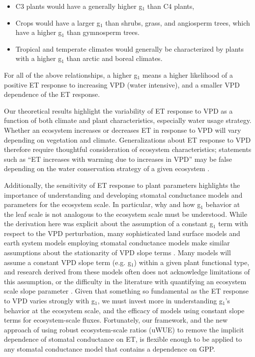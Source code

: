 \documentclass[12pt]{article}
\begin{document}
\begin{itemize}
  \item C3 plants would have a generally higher g$_1$ than C4 plants,
  \item Crops would have a larger g$_1$ than shrubs, grass, and
    angiosperm trees, which have a higher g$_1$ than gymnosperm
    trees.
  \item Tropical and temperate climates would generally be
    characterized by plants with a higher g$_1$ than arctic and boreal
    climates.
\end{itemize}
For all of the above relationships, a higher g$_1$ means a higher
likelihood of a positive ET response to increasing VPD (water
intensive), and a smaller VPD dependence of the ET response.

Our theoretical results highlight the variability of ET
response to VPD as a function of both climate  and plant
characteristics, especially water usage strategy. Whether an
ecosystem increases or decreases ET in response to VPD will vary
depending on vegetation and climate. Generalizations about ET response
to VPD therefore require thoughtful consideration of ecosystem
characteristics; statements such as ``ET increases with warming due to
increases in VPD'' may be false depending on the water conservation
strategy of a given ecosystem \cite{Lemordant_2018}.

Additionally, the sensitivity of ET response to plant parameters
highlights the importance of understanding and developing stomatal
conductance models and parameters for the ecosystem scale. In
particular, why and how g$_1$ behavior at the leaf scale is not
analogous to the ecosystem scale must be understood. While the
derivation here was explicit about the assumption of a constant g$_1$
term with respect to the VPD perturbation, many sophisticated land
surface models and earth system models employing stomatal conductance
models make similar assumptions about the stationarity of VPD slope
terms \cite{Niu_2011, Franks_2017, Rogers_2017, Lawrence_2019}. Many
models will assume a constant VPD slope term (e.g. g$_1$) within
a given plant functional type, and research derived from these models
often does not acknowledge limitations of this assumption, or the
difficulty in the literature with quantifying an ecosystem scale slope
parameter \cite{Medlyn_2017}. Given that something so fundamental as
the ET response to VPD varies strongly with g$_1$, we must invest more
in understanding g$_1$'s behavior at the ecosystem scale, and the
efficacy of models using constant slope terms for ecosystem-scale
fluxes. Fortunately, our framework, and the new approach of using
robust ecosystem-scale ratios (uWUE) to remove the implicit dependence
of stomatal conductance on ET, is flexible enough to be applied to any
stomatal conductance model that contains a dependence on GPP.
\end{document}
